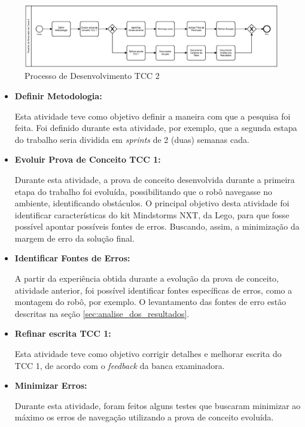 	\begin{figure}[H]
		\centering
		\includegraphics[scale=0.35]{figuras/processo_tcc2.eps}
		\caption[Processo de Desenvolvimento TCC 2]{Processo de Desenvolvimento TCC 2}
		\label{img:processo_tcc2}
	\end{figure}

\begin{itemize}
	\item \textbf{Definir Metodologia:}

	Esta atividade teve como objetivo definir a maneira com que a pesquisa foi feita. Foi definido durante esta atividade, por exemplo, que a segunda estapa
	do trabalho seria dividida em \textit{sprints} de 2 (duas) semanas cada.

	\item \textbf{Evoluir Prova de Conceito TCC 1:}

	Durante esta atividade, a prova de conceito desenvolvida durante a primeira etapa do trabalho foi evoluída, possibilitando que o
	robô navegasse no ambiente, identificando obstáculos. O principal objetivo desta atividade foi identificar características do kit
	Mindstorms NXT, da Lego, para que fosse possível apontar possíveis fontes de erros. Buscando, assim, a minimização da margem de erro
	da solução final.

	\item \textbf{Identificar Fontes de Erros:}

 	A partir da experiência obtida durante a evolução da prova de conceito, atividade anterior, foi possível identificar fontes específicas
	de erros, como a montagem do robô, por exemplo. O levantamento das fontes de erro estão descritas na seção \ref{sec:analise_dos_resultados}.

	\item \textbf{Refinar escrita TCC 1:}

	Esta atividade teve como objetivo corrigir detalhes e melhorar escrita do TCC 1, de acordo com o \textit{feedback} da banca examinadora.

	\item \textbf{Minimizar Erros:}

	Durante esta atividade, foram feitos alguns testes que buscaram minimizar ao máximo os erros de navegação utilizando a prova de conceito
	evoluída.


\end{itemize}
